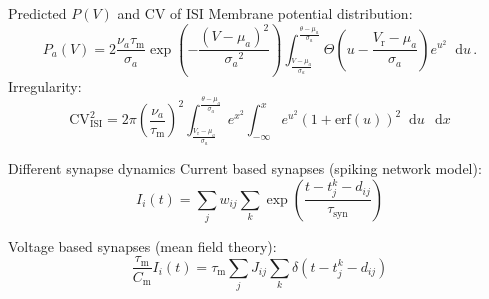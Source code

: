 \documentclass[xcolor=x11names,compress]{beamer}
\renewcommand{\(}{\begin{columns}}
\renewcommand{\)}{\end{columns}}
\newcommand{\<}[1]{\begin{column}{#1}}
\renewcommand{\>}{\end{column}}
\newcommand*\diff{\mathop{}\!\text{d}}
\begin{document}
\begin{frame}[t]{Predicted $P(V)$ and CV of ISI}
Membrane potential distribution:
\begin{equation*}
    P_a(V) = 2 \frac{\nu_a \tau_\text{m}}{\sigma_a} 
        \exp{\left(- \frac{(V - \mu_a)^2}{{\sigma_a}^2} \right)}
        \int_{\frac{V - \mu_a}{\sigma_a}}^{\frac{\theta - \mu_a}{\sigma_a}} \! 
            \Theta \left(u - \frac{V_\text{r} - \mu_a}{\sigma_a} \right) e^{u^2} \diff u  \,.
    \label{eq:P_V_a}
\end{equation*}
\vfill
Irregularity:
\begin{equation*}
    \text{CV}_\text{ISI}^2 
        = 2 \pi \left(\frac{\nu_a}{\tau_\text{m}}\right)^2
            \int_{\frac{V_\text{r} - \mu_{a}}{\sigma_{a}}}^{\frac{\theta - \mu_{a}}{\sigma_{a}}} 
            e^{x^2}  
            \int_{-\infty}^{x} 
            e^{u^2} \left(1 + \text{erf}(u)\right)^2 
            \diff u \, 
            \diff x 
\end{equation*}
\end{frame}

\begin{frame}[t]{Different synapse dynamics}
    Current based synapses (spiking network model):
    \begin{equation*}
        I_i(t) = 
            \sum_j w_{ij} \sum_k 
            \exp\left(\frac{t - t_j^k - d_{ij}}{\tau_\text{syn}}\right) 
    \end{equation*}
    
    \vspace{1cm}
    Voltage based synapses (mean field theory):
    \begin{equation*}
        \frac{\tau_\text{m}}{C_\text{m}} I_i(t) = 
            \tau_\text{m} \sum_j J_{ij} \sum_k \delta(t - t_j^k - d_{ij}) 
    \end{equation*}
\end{frame}
\end{document}
